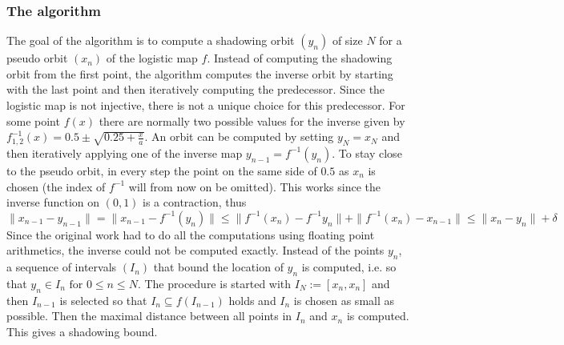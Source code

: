     \subsubsection{The algorithm}
    The goal of the algorithm is to compute a shadowing orbit $(y_n)$ of size $N$ for a pseudo orbit $(x_n)$ of the logistic map $f$.
  Instead of computing the shadowing orbit from the first point, the algorithm computes the inverse orbit by starting with the last point and then iteratively computing the predecessor. 
  Since the logistic map is not injective, there is not a unique choice for this predecessor. 
  For some point $f(x)$ there are normally two possible values for the inverse given by $f^{-1}_{1,2}(x) = 0.5 \pm \sqrt{0.25 + \frac{x}{a}} $.
  An orbit can be computed by setting $y_N = x_N$ and then iteratively applying one of the inverse map $y_{n-1} = f^{-1}(y_n)$.   To stay close to the pseudo orbit, in every step the point on the same side of $0.5$ as $x_n$ is chosen (the index of $f^{-1}$ will from now on be omitted). 
  This works since the inverse function on $(0,1)$ is a contraction, thus
  $$ \| x_{n-1} - y_{n-1} \| = \| x_{n-1} - f^{-1}(y_n) \| \leq \| f^{-1}(x_n) - f^{-1}{y_n} \| + \| f^{-1}(x_n) - x_{n-1} \| \leq \| x_n - y_n \| + \delta $$   
  Since the original work had to do all the computations using floating point arithmetics, the inverse could not be computed exactly.
  Instead of the points $y_n$, a sequence of intervals $(I_n)$ that bound the location of $y_n$ is computed, i.e. so that $y_n \in I_n \text{ for } 0 \leq n \leq N$.
  The procedure is started with $I_N := [x_n, x_n]$ and then $I_{n-1}$ is selected so that $I_n \subseteq f(I_{n-1})$ holds and $I_n$ is chosen as small as possible. 
  Then the maximal distance between all points in $I_n$ and $x_n$ is computed.
  This gives a shadowing bound.
